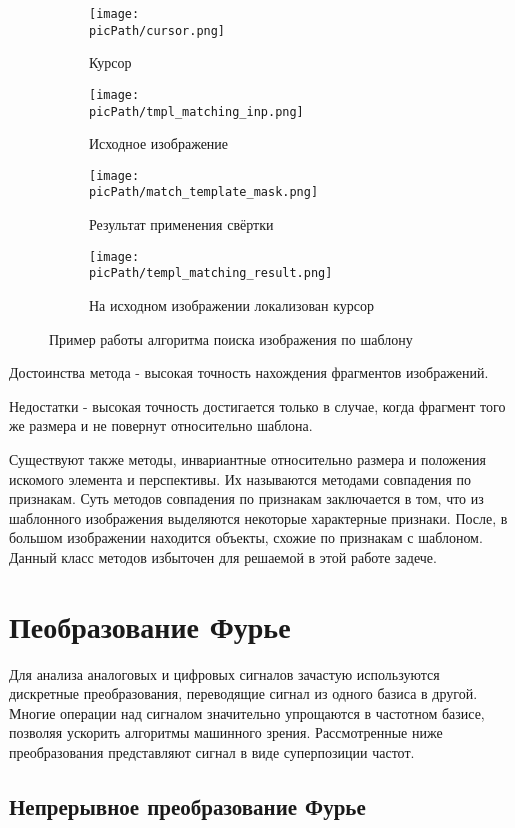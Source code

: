 \documentclass[oneside,final,14pt]{extreport}
\newcommand{\picPath}{pictures}
\begin{document}
\begin{figure}[h!]
  \centering
  \begin{subfigure}[b]{0.09\linewidth}
    \texttt{[image: \\picPath/cursor.png]}
    \caption{ Курсор}
  \end{subfigure}
  \begin{subfigure}[b]{0.4\linewidth}
    \texttt{[image: \\picPath/tmpl\_matching\_inp.png]}
    \caption{Исходное изображение}
  \end{subfigure}
  \begin{subfigure}[b]{0.4\linewidth}
    \texttt{[image: \\picPath/match\_template\_mask.png]}
    \caption{Результат применения свёртки}
  \end{subfigure}
  \begin{subfigure}[b]{0.4\linewidth}
    \texttt{[image: \\picPath/templ\_matching\_result.png]}
    \caption{На исходном изображении локализован курсор}
  \end{subfigure}
  \caption{Пример работы алгоритма поиска изображения по шаблону}
  \label{fig:coffee}
\end{figure}

Достоинства метода  - высокая точность нахождения фрагментов изображений.

Недостатки - высокая точность достигается только в случае, когда фрагмент того же размера и не повернут относительно шаблона. 
	
	Существуют также методы, инвариантные относительно размера и положения искомого элемента и перспективы. Их называются методами совпадения по признакам. Суть методов совпадения по признакам заключается в том, что из шаблонного изображения выделяются некоторые характерные признаки. После, в большом изображении находится объекты, схожие по признакам с шаблоном. Данный класс методов избыточен для решаемой в этой работе задече.
	
\chapter{Пеобразование Фурье}
Для анализа аналоговых и цифровых сигналов зачастую используются дискретные преобразования, переводящие сигнал из одного базиса в другой. Многие операции над сигналом значительно упрощаются в частотном базисе, позволяя ускорить алгоритмы машинного зрения. Рассмотренные ниже преобразования представляют сигнал в виде суперпозиции частот. 
\section{Непрерывное преобразование Фурье}
\end{document}
